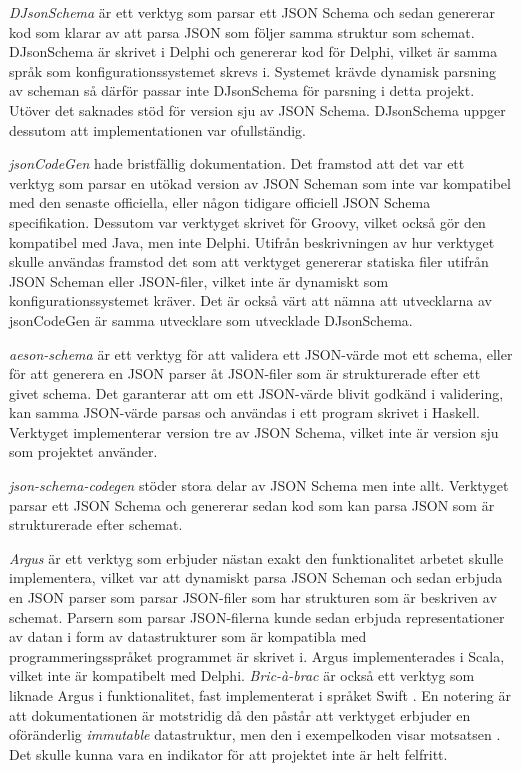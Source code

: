 \textit{DJsonSchema} är ett verktyg som parsar ett JSON Schema och sedan genererar kod som klarar av att parsa JSON som följer samma struktur som schemat. DJsonSchema är skrivet i Delphi och genererar kod för Delphi, vilket är samma språk som konfigurationssystemet skrevs i. Systemet krävde dynamisk parsning av scheman så därför passar inte DJsonSchema för parsning i detta projekt. Utöver det saknades stöd för version sju av JSON Schema. DJsonSchema uppger dessutom att implementationen var ofullständig. \cite{Schlothauer&WauerGmbH}

\textit{jsonCodeGen} hade bristfällig dokumentation. Det framstod att det var ett verktyg som parsar en utökad version av JSON Scheman som inte var kompatibel med den senaste officiella, eller någon tidigare officiell JSON Schema specifikation. Dessutom var verktyget skrivet för Groovy, vilket också gör den kompatibel med Java, men inte Delphi. Utifrån beskrivningen av hur verktyget skulle användas framstod det som att verktyget genererar statiska filer utifrån JSON Scheman eller JSON-filer, vilket inte är dynamiskt som konfigurationssystemet kräver. Det är också värt att nämna att utvecklarna av jsonCodeGen är samma utvecklare som utvecklade DJsonSchema. \cite{Schlothauer&WauerGmbHa} 

\textit{aeson-schema} är ett verktyg för att validera ett JSON-värde mot ett schema, eller för att generera en JSON parser åt JSON-filer som är strukturerade efter ett givet schema. Det garanterar att om ett JSON-värde blivit godkänd i validering, kan samma JSON-värde parsas och användas i ett program skrivet i Haskell. Verktyget implementerar version tre av JSON Schema, vilket inte är version sju som projektet använder. \cite{Kowalczyk}

\textit{json-schema-codegen} stöder stora delar av JSON Schema men inte allt. Verktyget parsar ett JSON Schema och genererar sedan kod som kan parsa JSON som är strukturerade efter schemat. \cite{Tundra}

\textit{Argus} är ett verktyg som erbjuder nästan exakt den funktionalitet arbetet skulle implementera, vilket var att dynamiskt parsa JSON Scheman och sedan erbjuda en JSON parser som parsar JSON-filer som har strukturen som är beskriven av schemat. Parsern som parsar JSON-filerna kunde sedan erbjuda representationer av datan i form av datastrukturer som är kompatibla med programmeringsspråket programmet är skrivet i. Argus implementerades i Scala, vilket inte är kompatibelt med Delphi. \cite{Fenton} \textit{Bric-à-brac} är också ett verktyg som liknade Argus i funktionalitet, fast implementerat i språket Swift \cite{GlimpseI/OInc}. En notering är att dokumentationen är motstridig då den påstår att verktyget erbjuder en oföränderlig \textit{immutable} datastruktur, men den i exempelkoden visar motsatsen \cite{GlimpseI/OInc}. Det skulle kunna vara en indikator för att projektet inte är helt felfritt.

